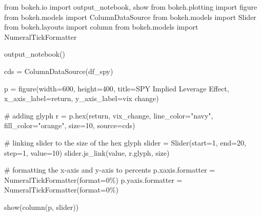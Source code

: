 \documentclass[
  letterpaper,
  DIV=11,
  numbers=noendperiod]{scrreprt}
\newenvironment{Shaded}{\begin{snugshade}}{\end{snugshade}}
\newcommand{\BuiltInTok}[1]{\textcolor[rgb]{0.00,0.23,0.31}{#1}}
\newcommand{\CommentTok}[1]{\textcolor[rgb]{0.37,0.37,0.37}{#1}}
\newcommand{\DecValTok}[1]{\textcolor[rgb]{0.68,0.00,0.00}{#1}}
\newcommand{\ImportTok}[1]{\textcolor[rgb]{0.00,0.46,0.62}{#1}}
\newcommand{\NormalTok}[1]{\textcolor[rgb]{0.00,0.23,0.31}{#1}}
\newcommand{\OperatorTok}[1]{\textcolor[rgb]{0.37,0.37,0.37}{#1}}
\newcommand{\StringTok}[1]{\textcolor[rgb]{0.13,0.47,0.30}{#1}}
\begin{document}
\begin{Shaded}
\begin{Highlighting}[]
\ImportTok{from}\NormalTok{ bokeh.io }\ImportTok{import}\NormalTok{ output\_notebook, show}
\ImportTok{from}\NormalTok{ bokeh.plotting }\ImportTok{import}\NormalTok{ figure}
\ImportTok{from}\NormalTok{ bokeh.models }\ImportTok{import}\NormalTok{ ColumnDataSource}
\ImportTok{from}\NormalTok{ bokeh.models }\ImportTok{import}\NormalTok{ Slider}
\ImportTok{from}\NormalTok{ bokeh.layouts }\ImportTok{import}\NormalTok{ column}
\ImportTok{from}\NormalTok{ bokeh.models }\ImportTok{import}\NormalTok{ NumeralTickFormatter}

\NormalTok{output\_notebook()}

\NormalTok{cds }\OperatorTok{=}\NormalTok{ ColumnDataSource(df\_spy)}

\NormalTok{p }\OperatorTok{=}\NormalTok{ figure(width}\OperatorTok{=}\DecValTok{600}\NormalTok{, height}\OperatorTok{=}\DecValTok{400}\NormalTok{, title}\OperatorTok{=}\StringTok{\textquotesingle{}SPY Implied Leverage Effect\textquotesingle{}}\NormalTok{,}
\NormalTok{           x\_axis\_label}\OperatorTok{=}\StringTok{\textquotesingle{}return\textquotesingle{}}\NormalTok{, y\_axis\_label}\OperatorTok{=}\StringTok{\textquotesingle{}vix change\textquotesingle{}}\NormalTok{)}

\CommentTok{\# adding glyph}
\NormalTok{r }\OperatorTok{=}\NormalTok{ p.}\BuiltInTok{hex}\NormalTok{(}\StringTok{\textquotesingle{}return\textquotesingle{}}\NormalTok{, }\StringTok{\textquotesingle{}vix\_change\textquotesingle{}}\NormalTok{, line\_color}\OperatorTok{=}\StringTok{"navy"}\NormalTok{, fill\_color}\OperatorTok{=}\StringTok{"orange"}\NormalTok{, size}\OperatorTok{=}\DecValTok{10}\NormalTok{, source}\OperatorTok{=}\NormalTok{cds)}

\CommentTok{\# linking slider to  the size of the hex glyph }
\NormalTok{slider }\OperatorTok{=}\NormalTok{ Slider(start}\OperatorTok{=}\DecValTok{1}\NormalTok{, end}\OperatorTok{=}\DecValTok{20}\NormalTok{, step}\OperatorTok{=}\DecValTok{1}\NormalTok{, value}\OperatorTok{=}\DecValTok{10}\NormalTok{)}
\NormalTok{slider.js\_link(}\StringTok{\textquotesingle{}value\textquotesingle{}}\NormalTok{, r.glyph, }\StringTok{\textquotesingle{}size\textquotesingle{}}\NormalTok{)}

\CommentTok{\# formatting the x{-}axis and y{-}axis to percents}
\NormalTok{p.xaxis.formatter }\OperatorTok{=}\NormalTok{ NumeralTickFormatter(}\BuiltInTok{format}\OperatorTok{=}\StringTok{\textquotesingle{}0\%\textquotesingle{}}\NormalTok{) }
\NormalTok{p.yaxis.formatter }\OperatorTok{=}\NormalTok{ NumeralTickFormatter(}\BuiltInTok{format}\OperatorTok{=}\StringTok{\textquotesingle{}0\%\textquotesingle{}}\NormalTok{)}

\NormalTok{show(column(p, slider))}
\end{Highlighting}
\end{Shaded}
\end{document}
